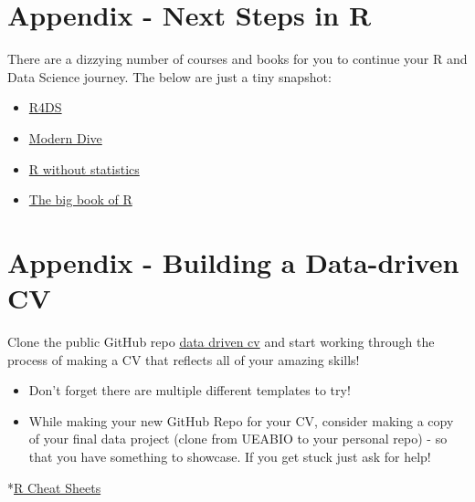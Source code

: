 \documentclass[
]{book}
\begin{document}
\hypertarget{appendix---next-steps-in-r}{%
\chapter{Appendix - Next Steps in R}\label{appendix---next-steps-in-r}}

There are a dizzying number of courses and books for you to continue your R and Data Science journey. The below are just a tiny snapshot:

\begin{itemize}
\item
  \href{https://r4ds.had.co.nz/}{R4DS}
\item
  \href{https://moderndive.com/}{Modern Dive}
\item
  \href{https://rwithoutstatistics.com/}{R without statistics}
\item
  \href{https://www.bigbookofr.com/}{The big book of R}
\end{itemize}

\hypertarget{appendix---building-a-data-driven-cv}{%
\chapter{Appendix - Building a Data-driven CV}\label{appendix---building-a-data-driven-cv}}

Clone the public GitHub repo \href{https://github.com/UEABIO/data-driven-cv}{data driven cv} and start working through the process of making a CV that reflects all of your amazing skills!

\begin{itemize}
\item
  Don't forget there are multiple different templates to try!
\item
  While making your new GitHub Repo for your CV, consider making a copy of your final data project (clone from UEABIO to your personal repo) - so that you have something to showcase. If you get stuck just ask for help!
\end{itemize}

*\href{https://www.rstudio.com/resources/cheatsheets/}{R Cheat Sheets}

  
\end{document}
